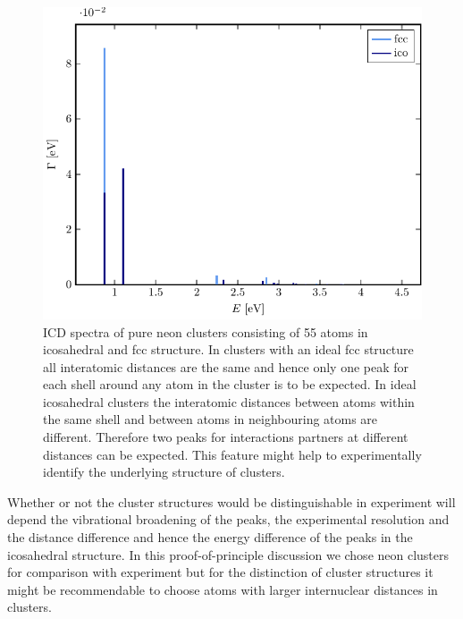 \begin{figure}[h]
 \centering
 \includegraphics[width=\columnwidth]{pics/reinNe}
 \caption{ICD spectra of pure neon clusters consisting of 55 atoms in
          icosahedral and fcc structure. In clusters with an ideal fcc structure
          all interatomic distances are the same and hence only one peak
          for each shell around any atom in the cluster is to be expected.
          In ideal icosahedral clusters the interatomic distances between atoms
          within the same shell and between atoms in neighbouring atoms
          are different. Therefore two peaks for interactions partners
          at different distances can be expected. This feature might
          help to experimentally identify the underlying structure of clusters.}
 \label{figure:reinNe}
\end{figure}

Whether or not the cluster structures would be distinguishable in experiment
will depend the vibrational broadening of the peaks, the experimental
resolution and the distance difference and hence the energy difference of the
peaks in the icosahedral structure. In this proof-of-principle discussion
we chose neon clusters for comparison with experiment but for the distinction
of cluster structures it might be recommendable to choose atoms with larger
internuclear distances in clusters.

